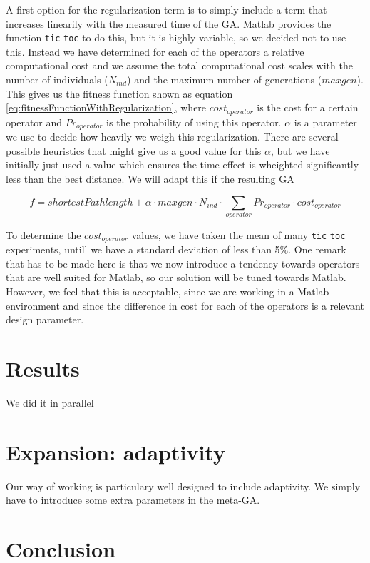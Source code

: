 \documentclass[a4paper]{article}
\begin{document}
A first option for the regularization term is to simply include a term that increases linearily with the measured time of the GA. Matlab provides the function \texttt{tic} \texttt{toc} to do this, but it is highly variable, so we decided not to use this. Instead we have determined for each of the operators a relative computational cost and we assume the total computational cost scales with the number of individuals ($N_{ind}$) and the maximum number of generations ($maxgen$). This gives us the fitness function shown as equation \ref{eq:fitnessFunctionWithRegularization}, where $cost_{operator}$ is the cost for a certain operator and $Pr_{operator}$ is the probability of using this operator. $\alpha$ is a parameter we use to decide how heavily we weigh this regularization. There are several possible heuristics that might give us a good value for this $\alpha$, but we have initially just used a value which ensures the time-effect is wheighted significantly less than the best distance. We will adapt this if the resulting GA 

\begin{equation}
	f=shortestPathlength + \alpha\cdot maxgen\cdot N_{ind}\cdot \sum_{operator}Pr_{operator}\cdot cost_{operator}
\label{eq:fitnessFunctionWithRegularization}
\end{equation}

To determine the $cost_{operator}$ values, we have taken the mean of many \texttt{tic} \texttt{toc} experiments, untill we have a standard deviation of less than 5\%. One remark that has to be made here is that we now introduce a tendency towards operators that are well suited for Matlab, so our solution will be tuned towards Matlab. However, we feel that this is acceptable, since we are working in a Matlab environment and since the difference in cost for each of the operators is a relevant design parameter.

\section{Results}

We did it in parallel

\section{Expansion: adaptivity}

Our way of working is particulary well designed to include adaptivity. We simply have to introduce some extra parameters in the meta-GA.

\section{Conclusion}
\end{document}
